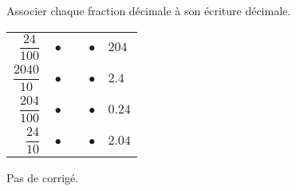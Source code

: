 \begin{exercice*}
    Associer chaque fraction décimale à son écriture décimale.
    \begin{center}
       \begin{tabular}{rp{1cm}l}
          $\dfrac{24}{100} \quad \bullet$ & & $\bullet \quad 204$ \\ [4mm]
          $\dfrac{\num{2 040}}{10} \quad \bullet$ & & $\bullet \quad \num{2.4}$ \\ [4mm]
          $\dfrac{204}{100} \quad \bullet$ & & $\bullet \quad \num{0.24}$ \\ [4mm]
          $\dfrac{24}{10} \quad \bullet$ & & $\bullet \quad \num{2.04}$ \\
       \end{tabular}
    \end{center}
 \end{exercice*}
\begin{corrige}
  Pas de corrigé.
\end{corrige}
